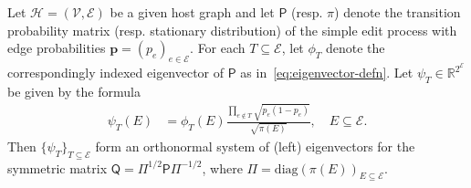 \documentclass[10pt,a4paper]{amsart}
\begin{document}
\begin{theorem}\label{thm:orthonormality}
    Let $\mathcal{H}=(\mathcal{V}, \mathcal{E})$ be a given host graph and let $\mathsf{P}$ (resp. $\pi$) denote the transition probability matrix (resp. stationary distribution) of the simple edit process with edge probabilities $\mathbf{p} = (p_e)_{e\in\mathcal{E}}$. For each $T\subseteq\mathcal{E}$, let $\phi_T$ denote the correspondingly indexed eigenvector of $\mathsf{P}$ as in~\cref{eq:eigenvector-defn}. Let $\psi_T\in\mathbb{R}^{2^\mathcal{E}}$ be given by the formula
        \begin{align*}
            \psi_T(E) &=\phi_T(E)  \frac{\prod_{e\notin T} \sqrt{p_e(1-p_e)}}{\sqrt{\pi(E)}},\quad E\subseteq\mathcal{E}.
        \end{align*}
    Then $\{\psi_T\}_{T\subseteq \mathcal{E}}$ form an orthonormal system of (left) eigenvectors for the symmetric matrix $\mathsf{Q} = \Pi^{1/2}\mathsf{P}\Pi^{-1/2}$, where $\Pi = \mathrm{diag}(\pi(E))_{E\subseteq\mathcal{E}}$.
\end{theorem}
\end{document}

